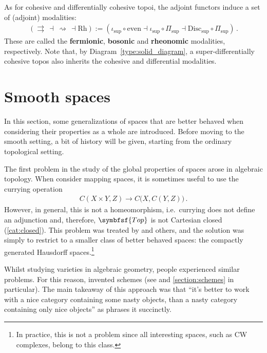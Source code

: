     \begin{property}
        As for cohesive and differentially cohesive topoi, the adjoint functors induce a set of (adjoint) modalities:
        \begin{gather}
            (\rightrightarrows\,\dashv\,\rightsquigarrow\,\dashv\mathrm{Rh}):=(\iota_{\text{sup}}\circ\mathrm{even}\dashv\iota_{\text{sup}}\circ\Pi_{\text{sup}}\dashv\mathrm{Disc}_{\text{sup}}\circ\Pi_{\text{sup}})\,.
        \end{gather}
        These are called the \textbf{fermionic}, \textbf{bosonic} and \textbf{rheonomic} modalities, respectively. Note that, by Diagram~\ref{type:solid_diagram}, a super-differentially cohesive topos also inherits the cohesive and differential modalities.
    \end{property}


\section{Smooth spaces}\label{section:smooth_spaces}

    In this section, some generalizations of spaces that are better behaved when considering their properties as a whole are introduced. Before moving to the smooth setting, a bit of history will be given, starting from the ordinary topological setting.

    The first problem in the study of the global properties of spaces arose in algebraic topology. When consider mapping spaces, it is sometimes useful to use the currying operation
    \begin{gather}
        C(X\times Y,Z)\rightarrow C\bigl(X,C(Y,Z)\bigr)\,.
    \end{gather}
    However, in general, this is not a homeomorphism, i.e.~currying does not define an adjunction and, therefore, $\symbfsf{Top}$ is not Cartesian closed (\cref{cat:closed}). This problem was treated by  and others, and the solution was simply to restrict to a smaller class of better behaved spaces: the compactly generated Hausdorff spaces.\footnote{In practice, this is not a problem since all interesting spaces, such as CW complexes, belong to this class.}

    Whilst studying varieties in algebraic geometry, people experienced similar problems. For this reason,  invented schemes (see  and \cref{section:schemes} in particular). The main takeaway of this approach was that ``it's better to work with a nice category containing some nasty objects, than a nasty category containing only nice objects'' as  phrases it succinctly.

